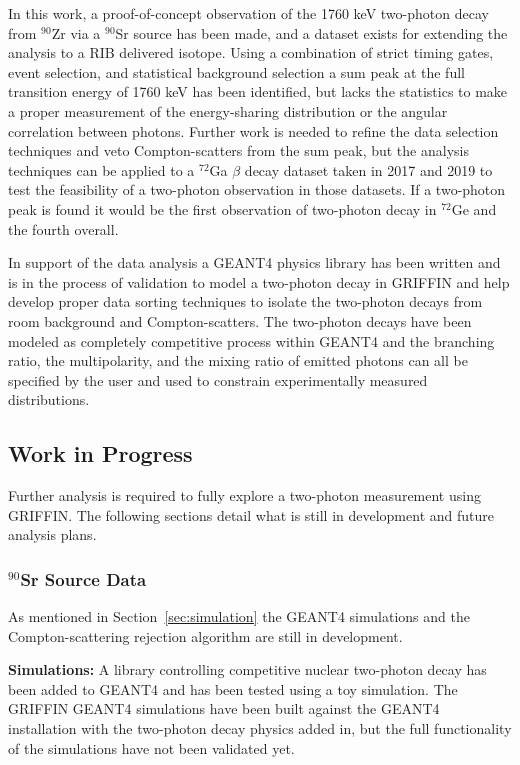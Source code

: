 \documentclass[cnatzke_thesis_proposal.tex]{subfiles}
\begin{document}

In this work, a proof-of-concept observation of the 1760 keV two-photon decay from $^{90}$Zr via a $^{90}$Sr source has been made, and a dataset exists for extending the analysis to a RIB delivered isotope. 
Using a combination of strict timing gates, event selection, and statistical background selection a sum peak at the full transition energy of 1760 keV has been identified, but lacks the statistics to make a proper measurement of the energy-sharing distribution or the angular correlation between photons.
Further work is needed to refine the data selection techniques and veto Compton-scatters from the sum peak, but the analysis techniques can be applied to a $^{72}$Ga $\beta$ decay dataset taken in 2017 and 2019 to test the feasibility of a two-photon observation in those datasets. 
If a two-photon peak is found it would be the first observation of two-photon decay in $^{72}$Ge and the fourth overall. 

In support of the data analysis a GEANT4 physics library has been written and is in the process of validation to model a two-photon decay in GRIFFIN and help develop proper data sorting techniques to isolate the two-photon decays from room background and Compton-scatters. 
The two-photon decays have been modeled as completely competitive process within GEANT4 and the branching ratio, the multipolarity, and the mixing ratio of emitted photons can all be specified by the user and used to constrain experimentally measured distributions. 



\subsection{Work in Progress}
Further analysis is required to fully explore a two-photon measurement using GRIFFIN. 
The following sections detail what is still in development and future analysis plans. 

\subsubsection{$^{90}$Sr Source Data}
As mentioned in Section~\ref{sec:simulation} the GEANT4 simulations and the Compton-scattering rejection algorithm are still in development. 

\textbf{Simulations:} A library controlling competitive nuclear two-photon decay has been added to GEANT4 and has been tested using a toy simulation.
The GRIFFIN GEANT4 simulations have been built against the GEANT4 installation with the two-photon decay physics added in, but the full functionality of the simulations have not been validated yet.
\end{document}
